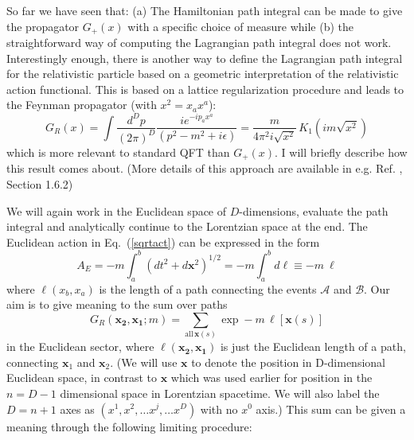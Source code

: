 \documentclass[12pt]{article}
\def\eq#1{{Eq.~(\ref{#1})}}
\begin{document}
So far we have seen that: (a) The Hamiltonian path integral can be made to give the propagator $G_+(x)$ with a specific choice of measure while (b) the straightforward way of computing the Lagrangian path integral does not work.
Interestingly enough, there is another way to define the Lagrangian path integral for the relativistic particle based on a geometric interpretation of the relativistic  action functional. This is based on  a lattice regularization procedure and leads to the Feynman propagator (with $x^2=x_ax^a$):
 \begin{equation}
G_R(x)=\int \frac{d^Dp}{(2\pi)^D}\frac{ie^{-ip_ax^a}}{(p^2-m^2+i\epsilon)}
 =\frac{m}{4\pi^2 i \sqrt{x^2}} \, K_1(im\sqrt{x^2})
\label{gfinft}
\end{equation} 
which is more relevant to standard QFT than  $G_+(x)$. I will briefly describe how this result comes about. (More details of this approach are available in e.g. Ref. \cite{tpqft}, Section 1.6.2)

 We will again work  in the Euclidean space of $D$-dimensions, evaluate the path integral and analytically continue to the Lorentzian space at the end.
The Euclidean action in \eq{sqrtact} can be expressed in the form 
\begin{equation}
 A_E = - m \int_a^b (dt^2+ d\bm{x}^2)^{1/2} = - m \int_a^b d\ell \equiv - m\  \ell 
\end{equation} 
where $\ell(x_b,x_a)$ is the length of a path connecting the events $\mathcal{A}$ and $\mathcal{B}$.  
 Our aim is  to give meaning to the sum over paths
\begin{equation} 
G_R(\mathbf{ x_2, x_1};m)=
\sum_{\mathrm{all}\,{\mathbf x}(s)}\exp
-m\,\ell[\mathbf{ x}(s)] 
\label{qlat}
\end{equation} 
in the Euclidean sector, where
$
 \ell(\mathbf{ x_2,x_1})
$ 
is just the Euclidean length of a path, connecting
${\mathbf x}_1$ and ${\mathbf x}_2$. (We will use $\mathbf{x}$ to denote the position in D-dimensional Euclidean space, in contrast to $\bm{x}$ which was used earlier for position in the $n=D-1$ dimensional space in Lorentzian spacetime. We will also label the $D=n+1$ axes as $(x^1, x^2, \ldots x^j, \ldots x^D)$ with no $x^0$ axis.)
This sum can be given a meaning through the following limiting procedure:
\end{document}
